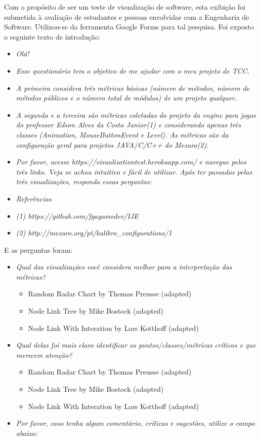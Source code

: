 Com o propósito de ser um teste de visualização de software, esta exibição foi
submetida à avaliação de estudantes e pessoas envolvidas com a Engenharia de
Software. Utilizou-se da ferramenta Google Forms para tal pesquisa. Foi exposto
o seguinte texto de introdução:


\begin{itemize}
  \item[] \textit{Olá!}
  \item[] \textit{Esse questionário tem o objetivo de me ajudar com o meu
	projeto de TCC.}
  \item[] \textit{A primeira considera três métricas básicas (número de
	métodos, número de métodos públicos e o número total de módulos) de um
	projeto qualquer.}
  \item[] \textit{A segunda e a terceira são métricas coletadas do projeto da
	engine para jogos do professor Edson Alves da Costa Junior(1) e considerando
	apenas três classes (Animation, MouseButtonEvent e Level). As métricas são da
	configuração geral para projetos JAVA/C/C++ do Mezuro(2).}
	\item[] \textit{Por favor, acesse https://visualizationtest.herokuapp.com/ e
	navegue pelos três links. Veja se achou intuitivo e fácil de utilizar. Após
	ter passadas pelas três visualizações, responda essas perguntas:}
	\item[] \textit{Referências}
	\item[] \textit{(1) https://github.com/fgagamedev/IJE}
	\item[] \textit{(2) http://mezuro.org/pt/kalibro\_configurations/1}
\end{itemize}

E as perguntas foram:

\begin{itemize}
  \item[] \textit{Qual das visualizações você considera melhor para a
	interpretação das métricas?}
		\begin{itemize}
			\item {Random Radar Chart by Thomas Preusse (adapted)}
			\item {Node Link Tree by Mike Bostock (adapted)}
			\item {Node Link With Interation by Lars Kotthoff (adapted)}
		\end{itemize}
  \item[] \textit{Qual delas foi mais claro identificar os
	pontos/classes/métricas críticos e que merecem atenção?}
		\begin{itemize}
			\item {Random Radar Chart by Thomas Preusse (adapted)}
			\item {Node Link Tree by Mike Bostock (adapted)}
			\item {Node Link With Interation by Lars Kotthoff (adapted)}
		\end{itemize}
  \item[] \textit{Por favor, caso tenha algum comentário, críticas e sugestões,
	utilize o campo abaixo:}
\end{itemize}


